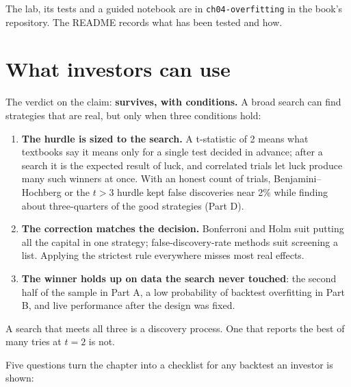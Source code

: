 The lab, its tests and a guided notebook are in \texttt{ch04-overfitting} in the book's repository. The README records what has been tested and how.

\section{What investors can use}
\label{sec:04-investors}

The verdict on the claim: \textbf{survives, with conditions.} A broad search can find strategies that are real, but only when three conditions hold:

\begin{enumerate}
  \item \textbf{The hurdle is sized to the search.} A t-statistic of 2 means what textbooks say it means only for a single test decided in advance; after a search it is the expected result of luck, and correlated trials let luck produce many such winners at once. With an honest count of trials, Benjamini--Hochberg or the $t > 3$ hurdle kept false discoveries near 2\% while finding about three-quarters of the good strategies (Part D).
  \item \textbf{The correction matches the decision.} Bonferroni and Holm suit putting all the capital in one strategy; false-discovery-rate methods suit screening a list. Applying the strictest rule everywhere misses most real effects.
  \item \textbf{The winner holds up on data the search never touched}: the second half of the sample in Part A, a low probability of backtest overfitting in Part B, and live performance after the design was fixed.
\end{enumerate}

A search that meets all three is a discovery process. One that reports the best of many tries at $t = 2$ is not.

Five questions turn the chapter into a checklist for any backtest an investor is shown:

